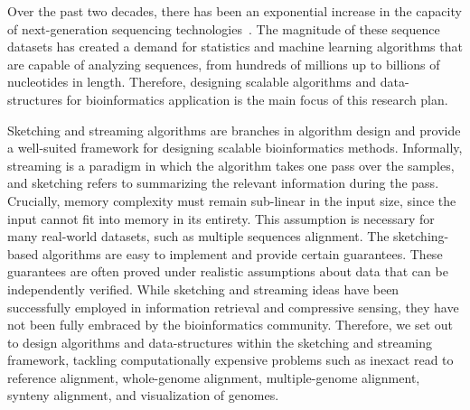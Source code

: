Over the past two decades, there has been an exponential increase in the capacity of next-generation sequencing technologies~\cite{stephens2015big}. The magnitude of these sequence datasets has created a demand for statistics and machine learning algorithms that are capable of analyzing sequences, from hundreds of millions up to billions of nucleotides in length. Therefore, designing scalable algorithms and data-structures for bioinformatics application is the main focus of this research plan. 

Sketching and streaming algorithms are branches in algorithm design and provide a well-suited framework for designing scalable bioinformatics methods. Informally, streaming is a paradigm in which the algorithm takes one pass over the samples, and sketching refers to summarizing the relevant information during the pass. Crucially, memory complexity must remain sub-linear in the input size, since the input cannot fit into memory in its entirety. This assumption is necessary for many real-world datasets, such as multiple sequences alignment. The sketching-based algorithms are easy to implement and provide certain guarantees. These guarantees are often proved under realistic assumptions about data that can be independently verified. While sketching and streaming ideas have been successfully employed in information retrieval and compressive sensing, they have not been fully embraced by the bioinformatics community. Therefore, we set out to design algorithms and data-structures within the sketching and streaming framework, tackling computationally expensive problems such as inexact read to reference alignment, whole-genome alignment, multiple-genome alignment, synteny alignment, and visualization of genomes.